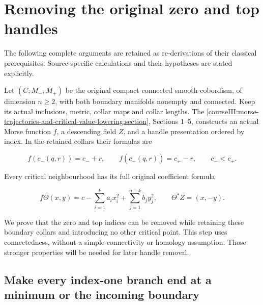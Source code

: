 \section{Removing the original zero and top handles}\label{courseIII:removing-the-original-zero-and-top-handles:section}

The following complete arguments are retained as re-derivations of their classical prerequisites. Source-specific calculations and their hypotheses are stated explicitly.

Let \((C;M_-,M_+)\) be the original compact connected smooth cobordism, of dimension \(n\geq2\), with both boundary manifolds nonempty and connected. Keep its actual inclusions, metric, collar maps and collar lengths. The \cref{courseIII:morse-trajectories-and-critical-value-lowering:section}, Sections 1--5, constructs an actual Morse function \(f\), a descending field \(Z\), and a handle presentation ordered by index. In the retained collars their formulas are

\begin{equation}
f(c_-(q,r))=c_-+r,\qquad
 f(c_+(q,r))=c_+-r,\qquad c_-<c_+.
 \label{courseIII:removing-the-original-zero-and-top-handles:eq:0.1}
\end{equation}

Every critical neighbourhood has its full original coefficient formula

\begin{equation}
f\Theta(x,y)=c-\sum_{i=1}^{k}a_ix_i^2
                    +\sum_{j=1}^{n-k}b_jy_j^2,
 \qquad
 \Theta^*Z=(x,-y).
 \label{courseIII:removing-the-original-zero-and-top-handles:eq:0.2}
\end{equation}

We prove that the zero and top indices can be removed while retaining these boundary collars and introducing no other critical point. This step uses connectedness, without a simple-connectivity or homology assumption. Those stronger properties will be needed for later handle removal.

\subsection{Make every index-one branch end at a minimum or the incoming boundary}
\label{courseIII:removing-the-original-zero-and-top-handles:zero-branch-arrangement}

\label{courseIII:removing-the-original-zero-and-top-handles:section-1}\label{courseIII:zero-top:1}

